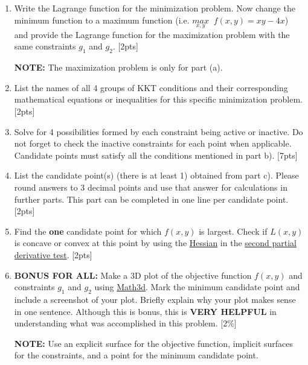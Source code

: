 \documentclass{article}
\begin{document}
\begin{enumerate}[label=(\alph*)]
    \item Write the Lagrange function for the minimization problem. Now change the minimum function to a maximum function (i.e. $\underset{x,y}{max} \;\; f(x,y) = xy - 4x$) and provide the Lagrange function for the maximization problem with the same constraints $g_1$ and $g_2$.  [2pts]
        \par\textbf{NOTE:} The maximization problem is only for part (a).
    \item List the names of all 4 groups of KKT conditions and their corresponding mathematical equations or inequalities for this specific minimization problem. [2pts]
    \item Solve for 4 possibilities formed by each constraint being active or inactive. Do not forget to check the inactive constraints for each point when applicable. Candidate points must satisfy all the conditions mentioned in part b).   [7pts]
    \item List the candidate point(s) (there is at least 1) obtained from part c). Please round answers to 3 decimal points and use that answer for calculations in further parts. This part can be completed in one line per candidate point. [2pts]
    \item Find the \textbf{one} candidate point for which $f(x,y)$ is largest. Check if $L(x,y)$ is concave or convex at this point by using the \href{https://www.khanacademy.org/math/multivariable-calculus/applications-of-multivariable-derivatives/quadratic-approximations/a/the-hessian}{Hessian} in the \href{https://www.khanacademy.org/math/multivariable-calculus/applications-of-multivariable-derivatives/optimizing-multivariable-functions/a/second-partial-derivative-test}{second partial derivative test}.  [2pts]
    \item \textbf{BONUS FOR ALL:} Make a 3D plot of the objective function $f(x,y)$ and constraints $g_1$ and $g_2$ using \href{https://www.math3d.org/}{Math3d}. Mark the minimum candidate point and include a screenshot of your plot. Briefly explain why your plot makes sense in one sentence. Although this is bonus, this is \textbf{VERY HELPFUL} in understanding what was accomplished in this problem. [2\%]
    \par\textbf{NOTE:} Use an explicit surface for the objective function, implicit surfaces for the constraints, and a point for the minimum candidate point. \\
\end{enumerate}
\end{document}
